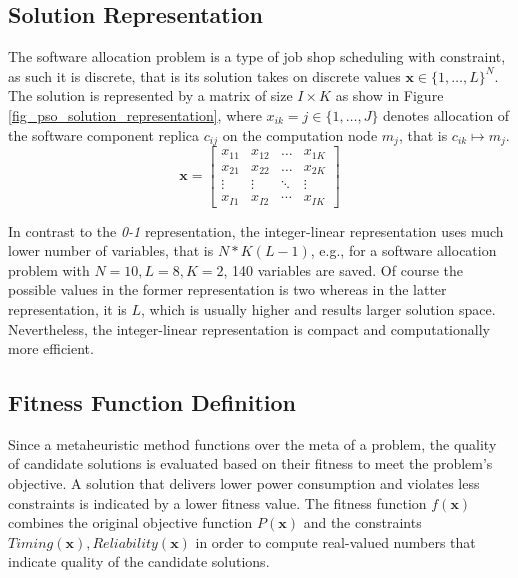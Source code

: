 \subsection{Solution Representation}
The software allocation problem is a type of job shop scheduling with constraint, as such it is discrete, that is its solution takes on discrete values $\textbf{x}\in \{1,…,L\}^N$. The solution is represented by a matrix of size $I\times K$ as show in Figure \ref{fig_pso_solution_representation}, where $x_{ik}=j\in \{1,…,J\}$ denotes allocation of the software component replica $c_{ij}$ on the computation node $m_j$, that is $c_{ik}\mapsto m_j$.
\begin{equation}
\label{fig_pso_solution_representation}
\textbf{x}=
\begin{bmatrix} 
x_{11} & x_{12} & \dots & x_{1K}\\
x_{21} & x_{22} & \dots & x_{2K}\\
\vdots & \vdots & \ddots & \vdots\\
x_{I1} & x_{I2} & \cdots & x_{IK}
\end{bmatrix}
\end{equation}

In contrast to the \textit{0-1} representation, the integer-linear representation uses much lower number of variables, that is $N*K(L-1)$, e.g., for a software allocation problem with $N=10,L=8,K=2$, 140 variables are saved. Of course the possible values in the former representation is two whereas in the latter representation, it is $L$, which is usually higher and results larger solution space. Nevertheless, the integer-linear representation is compact and computationally more efficient.

\subsection{Fitness Function Definition}
Since a metaheuristic method functions over the meta of a problem, the quality of candidate solutions is evaluated based on their fitness to meet the problem's objective. A solution that delivers lower power consumption and violates less constraints is indicated by a lower fitness value. The fitness function $f(\textbf{x})$ combines the original objective function $P(\textbf{x})$ and the constraints $Timing(\textbf{x}),Reliability(\textbf{x})$ in order to compute real-valued numbers that indicate quality of the candidate solutions.

